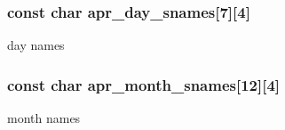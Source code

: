 \subsubsection[{\texorpdfstring{apr\+\_\+day\+\_\+snames}{apr_day_snames}}]{\setlength{\rightskip}{0pt plus 5cm}const char apr\+\_\+day\+\_\+snames\mbox{[}7\mbox{]}\mbox{[}4\mbox{]}}\hypertarget{group__apr__time_ga37d6f7740ae0f5d8ae9cfc286e8712be}{}\label{group__apr__time_ga37d6f7740ae0f5d8ae9cfc286e8712be}
day names 
\subsubsection[{\texorpdfstring{apr\+\_\+month\+\_\+snames}{apr_month_snames}}]{\setlength{\rightskip}{0pt plus 5cm}const char apr\+\_\+month\+\_\+snames\mbox{[}12\mbox{]}\mbox{[}4\mbox{]}}\hypertarget{group__apr__time_ga77382d017a2bef80d44478e0b41557a4}{}\label{group__apr__time_ga77382d017a2bef80d44478e0b41557a4}
month names 